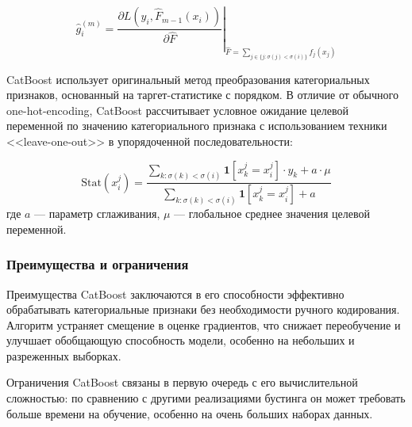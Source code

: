 \begin{equation}
\hat{g}_i^{(m)} = \left. \frac{\partial L(y_i, \hat{F}_{m-1}(x_i))}{\partial \hat{F}} \right|_{\hat{F} = \sum_{j \in \{j: \sigma(j) < \sigma(i)\}} f_j(x_j)}
\end{equation}

CatBoost использует оригинальный метод преобразования категориальных признаков, основанный на таргет-статистике с порядком. В отличие от обычного one-hot-encoding, CatBoost рассчитывает условное ожидание целевой переменной по значению категориального признака с использованием техники <<leave-one-out>> в упорядоченной последовательности:

\begin{equation}
\text{Stat}(x_i^j) = \frac{\sum_{k: \sigma(k) < \sigma(i)} \mathbf{1}[x_k^j = x_i^j] \cdot y_k + a \cdot \mu}{\sum_{k: \sigma(k) < \sigma(i)} \mathbf{1}[x_k^j = x_i^j] + a}
\end{equation}
где $a$ — параметр сглаживания, $\mu$ — глобальное среднее значения целевой переменной.

\subsubsection{Преимущества и ограничения}

Преимущества CatBoost заключаются в его способности эффективно обрабатывать категориальные признаки без необходимости ручного кодирования. Алгоритм устраняет смещение в оценке градиентов, что снижает переобучение и улучшает обобщающую способность модели, особенно на небольших и разреженных выборках.

Ограничения CatBoost связаны в первую очередь с его вычислительной сложностью: по сравнению с другими реализациями бустинга он может требовать больше времени на обучение, особенно на очень больших наборах данных.


